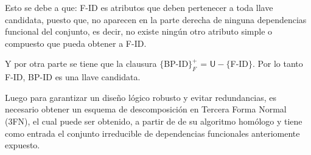 \documentclass{report}
\begin{document}
    Esto se debe a que: F-ID es atributos que deben pertenecer a toda llave candidata, puesto que,
    no aparecen en la parte derecha de ninguna dependencias funcional del conjunto, es decir, no existe ningún
    otro atributo simple o compuesto que pueda obtener a F-ID. \newline
    
    Y por otra parte se tiene que la clausura $\{$BP-ID$\}_{F}^{+}$ = $\mathsf{U} - \{$F-ID$\}$. Por lo tanto F-ID, BP-ID es una llave candidata. \newline

    Luego para garantizar un diseño lógico robusto y evitar redundancias, es necesario obtener un esquema de descomposición en Tercera Forma Normal (3FN),
    el cual puede ser obtenido, a partir de de su algoritmo homólogo y tiene como entrada el conjunto irreducible de dependencias funcionales anteriomente expuesto. \newline
      
\end{document}
